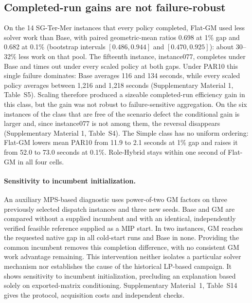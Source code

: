 \documentclass[11pt]{article}
\theoremstyle{definition}
\theoremstyle{remark}
\begin{document}
\subsection{Completed-run gains are not failure-robust}
\label{subsec:results-operational}
On the 14 SG-Ter-Mer instances that every policy completed, Flat-GM used less solver work than
Base, with paired geometric-mean ratios 0.698 at 1\% gap and 0.682 at 0.1\% (bootstrap
intervals $[0.486,0.944]$ and $[0.470,0.925]$): about 30--32\% less work on that pool. The
fifteenth instance, instance077, completes under Base and times out under every scaled policy
at both gaps. Under PAR10 this single failure dominates: Base averages 116 and 134 seconds,
while every scaled policy averages between 1,216 and 1,218 seconds (Supplementary Material 1,
Table~S5). Scaling therefore produced a sizeable completed-run efficiency gain in this class,
but the gain was not robust to failure-sensitive aggregation. On the six instances of the class
that are free of the scenario defect the conditional gain is larger and, since instance077 is
not among them, the reversal disappears (Supplementary Material 1, Table~S4). The Simple class has no uniform ordering: Flat-GM
lowers mean PAR10 from 11.9 to 2.1 seconds at 1\% gap and raises it from 52.0 to 73.0 seconds
at 0.1\%. Role-Hybrid stays within one second of Flat-GM in all four cells.

\paragraph{Sensitivity to incumbent initialization.}
An auxiliary MPS-based diagnostic uses power-of-two GM factors on three previously
selected dispatch instances and three new seeds. Base and GM are compared without a
supplied incumbent and with an identical, independently verified feasible reference
supplied as a MIP start. In two instances, GM reaches the requested native gap in all
cold-start runs and Base in none. Providing the common incumbent removes this completion
difference, with no consistent GM work advantage remaining. This intervention neither
isolates a particular solver mechanism nor establishes the cause of the historical
LP-based campaign. It shows sensitivity to incumbent initialization, precluding an
explanation based solely on exported-matrix conditioning. Supplementary Material~1,
Table~S14 gives the protocol, acquisition costs and independent checks.
\end{document}

